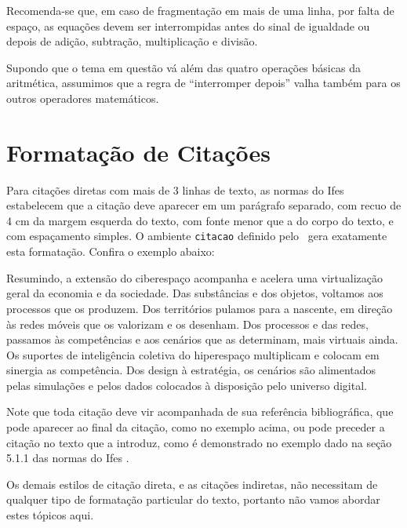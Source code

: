 \documentclass[times,english,brazil,oneside]{ifes7}
\begin{document}
\begin{citacao}
  Recomenda-se que, em caso de fragmentação em mais de uma linha, por
  falta de espaço, as equações devem ser interrompidas antes do sinal
  de igualdade ou depois de adição, subtração, multiplicação e
  divisão.
\end{citacao}

Supondo que o tema em questão vá além das quatro operações básicas da
aritmética, assumimos que a regra de ``interromper depois'' valha
também para os outros operadores matemáticos.


\section{Formatação de Citações}
\label{sec:format-citac}

Para citações diretas com mais de 3 linhas de texto, as normas do Ifes
estabelecem que a citação deve aparecer em um parágrafo separado, com
recuo de 4 cm da margem esquerda do texto, com fonte menor que a do
corpo do texto, e com espaçamento simples. O ambiente \texttt{citacao}
definido pelo \abnTeX\ gera exatamente esta formatação. Confira o
exemplo abaixo:

\begin{citacao}
  Resumindo, a extensão do ciberespaço acompanha e acelera uma
  virtualização geral da economia e da sociedade. Das substâncias e
  dos objetos, voltamos aos processos que os produzem. Dos territórios
  pulamos para a nascente, em direção às redes móveis que os valorizam
  e os desenham. Dos processos e das redes, passamos às competências e
  aos cenários que as determinam, mais virtuais ainda. Os suportes de
  inteligência coletiva do hiperespaço multiplicam e colocam em
  sinergia as competência. Dos design à estratégia, os cenários são
  alimentados pelas simulações e pelos dados colocados à disposição
  pelo universo digital. \cite{Levy1999}
\end{citacao}

Note que toda citação deve vir acompanhada de sua referência
bibliográfica, que pode aparecer ao final da citação, como no exemplo
acima, ou pode preceder a citação no texto que a introduz, como é
demonstrado no exemplo dado na seção 5.1.1 das normas do Ifes
\cite[p.~39]{Ifes2014}.

Os demais estilos de citação direta, e as citações indiretas, não
necessitam de qualquer tipo de formatação particular do texto,
portanto não vamos abordar estes tópicos aqui.
\end{document}
